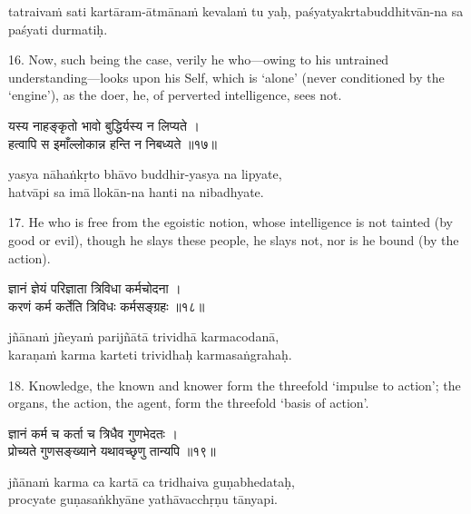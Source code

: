 \begin{transliteration}
tatraivaṁ sati kartāram-ātmānaṁ kevalaṁ tu yaḥ, paśyatyakrtabuddhitvān-na sa paśyati durmatiḥ.
\end{transliteration}

16. Now, such being the case, verily he who---owing to his untrained
understanding---looks upon his Self, which is `alone' (never conditioned by the
`engine'), as the doer, he, of perverted intelligence, sees not.

\begin{gitaverse}
यस्य नाहङ्कृतो भावो बुद्धिर्यस्य न लिप्यते । \\
हत्वापि स इमाँल्लोकान्न हन्ति न निबध्यते ॥१७॥
\end{gitaverse}

\begin{transliteration}
yasya nāhaṅkṛto bhāvo buddhir-yasya na lipyate, \\
hatvāpi sa imāllokān-na hanti na nibadhyate.
\end{transliteration}

17. He who is free from the egoistic notion, whose intelligence is not tainted
(by good or evil), though he slays these people, he slays not, nor is he bound
(by the action).

\begin{gitaverse}
ज्ञानं ज्ञेयं परिज्ञाता त्रिविधा कर्मचोदना । \\
करणं कर्म कर्तेति त्रिविधः कर्मसङ्ग्रहः ॥१८॥
\end{gitaverse}

\begin{transliteration}
jñānaṁ jñeyaṁ parijñātā trividhā karmacodanā, \\
karaṇaṁ karma karteti trividhaḥ karmasaṅgrahaḥ.
\end{transliteration}

18. Knowledge, the known and knower form the threefold `impulse to action'; the
organs, the action, the agent, form the threefold `basis of action'.

\begin{gitaverse}
ज्ञानं कर्म च कर्ता च त्रिधैव गुणभेदतः । \\
प्रोच्यते गुणसङ्ख्याने यथावच्छृणु तान्यपि ॥१९॥
\end{gitaverse}

\begin{transliteration}
jñānaṁ karma ca kartā ca tridhaiva guṇabhedataḥ, \\
procyate guṇasaṅkhyāne yathāvacchṛṇu tānyapi.
\end{transliteration}

